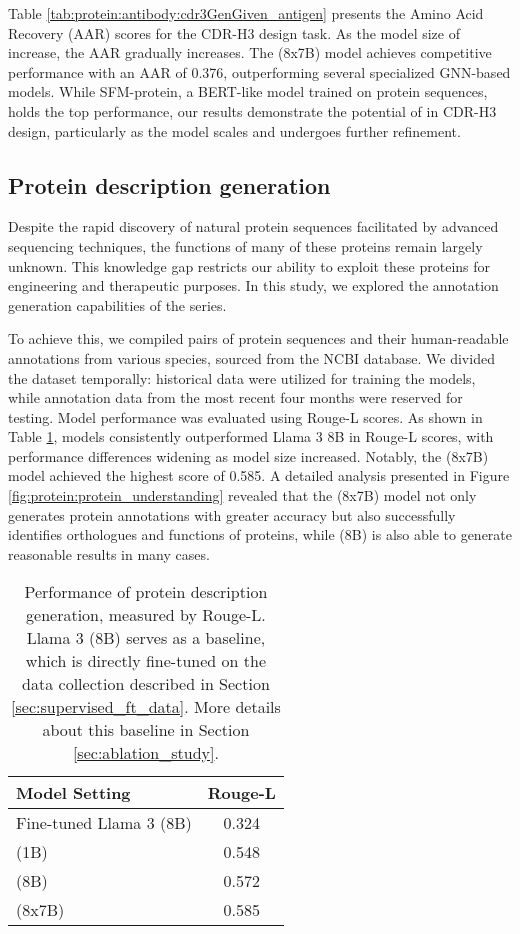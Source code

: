 Table \ref{tab:protein:antibody:cdr3GenGiven_antigen} presents the Amino Acid Recovery (AAR) scores for the CDR-H3 design task. As the model size of \ourM{} increase, the AAR gradually increases. The \ourM{} (8x7B) model achieves competitive performance with an AAR of 0.376, outperforming several specialized GNN-based models. While SFM-protein, a BERT-like model trained on protein sequences, holds the top performance, our results demonstrate the potential of \ourM{} in CDR-H3 design, particularly as the model scales and undergoes further refinement.

\subsection{Protein description generation}\label{sec:protein_to_desc}
Despite the rapid discovery of natural protein sequences facilitated by advanced sequencing techniques, the functions of many of these proteins remain largely unknown. This knowledge gap restricts our ability to exploit these proteins for engineering and therapeutic purposes. In this study, we explored the annotation generation capabilities of the \ourM{} series.

To achieve this, we compiled pairs of protein sequences and their human-readable annotations from various species, sourced from the NCBI database. We divided the dataset temporally: historical data were utilized for training the \ourM{} models, while annotation data from the most recent four months were reserved for testing. Model performance was evaluated using Rouge-L scores. As shown in Table \ref{tab:protein:ncbi_description}, \ourM{} models consistently outperformed Llama 3 8B in Rouge-L scores, with performance differences widening as model size increased. Notably, the \ourM{} (8x7B) model achieved the highest score of 0.585. A detailed analysis presented in Figure \ref{fig:protein:protein_understanding} revealed that the \ourM{} (8x7B) model not only generates protein annotations with greater accuracy but also successfully identifies orthologues and functions of proteins, while \ourM{} (8B) is also able to generate reasonable results in many cases.



\begin{table}[!htbp]
\centering
\begin{tabular}{lc}
\toprule
Model Setting & Rouge-L\\
\midrule
Fine-tuned Llama 3 (8B) & 0.324 \\
\ourM{} (1B) & 0.548 \\
\ourM{} (8B) & 0.572 \\
\ourM{} (8x7B) & 0.585 \\
\bottomrule
\end{tabular}
\caption{Performance of protein description generation, measured by Rouge-L. Llama 3 (8B) serves as a baseline, which is directly fine-tuned on the data collection described in Section \ref{sec:supervised_ft_data}. More details about this baseline in Section \ref{sec:ablation_study}.}
\label{tab:protein:ncbi_description}
\end{table}

